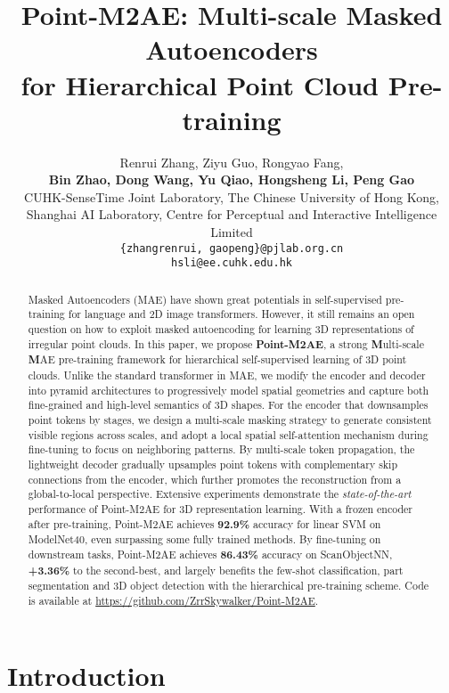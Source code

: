 \documentclass{article}
\title{Point-M2AE: Multi-scale Masked Autoencoders\\ for Hierarchical Point Cloud Pre-training}
\author{Renrui Zhang, Ziyu Guo, Rongyao Fang,\vspace{0.1cm}\\ \textbf{Bin Zhao, Dong Wang, Yu Qiao, Hongsheng Li, Peng Gao\textsuperscript{\Letter}}\vspace{0.3cm}\\
   CUHK-SenseTime Joint Laboratory, The Chinese University of Hong Kong,\\
   Shanghai AI Laboratory,
   Centre for Perceptual and Interactive Intelligence Limited\vspace{0.1cm}\\
  \texttt{\{zhangrenrui, gaopeng\}@pjlab.org.cn} \\
  \texttt{hsli@ee.cuhk.edu.hk} \\
}
\begin{document}
\maketitle


\begin{abstract}
Masked Autoencoders (MAE) have shown great potentials in self-supervised pre-training for language and 2D image transformers. However, it still remains an open question on how to exploit masked autoencoding for learning 3D representations of irregular point clouds. In this paper, we propose \textbf{Point-M2AE}, a strong \textbf{M}ulti-scale \textbf{M}AE pre-training framework for hierarchical self-supervised learning of 3D point clouds. Unlike the standard transformer in MAE, we modify the encoder and decoder into pyramid architectures to progressively model spatial geometries and capture both fine-grained and high-level semantics of 3D shapes. For the encoder that downsamples point tokens by stages, we design a multi-scale masking strategy to generate consistent visible regions across scales, and adopt a local spatial self-attention mechanism during fine-tuning to focus on neighboring patterns. By multi-scale token propagation, the lightweight decoder gradually upsamples point tokens with complementary skip connections from the encoder, which further promotes the reconstruction from a global-to-local perspective. 
Extensive experiments demonstrate the \textit{state-of-the-art} performance of Point-M2AE for 3D representation learning. With a frozen encoder after pre-training, Point-M2AE achieves \textbf{92.9\%} accuracy for linear SVM on ModelNet40, even surpassing some fully trained methods. By fine-tuning on downstream tasks, Point-M2AE achieves \textbf{86.43\%} accuracy on ScanObjectNN, \textbf{+3.36\%} to the second-best, and largely benefits the few-shot classification, part segmentation and 3D object detection with the hierarchical pre-training scheme. Code is available at \url{https://github.com/ZrrSkywalker/Point-M2AE}.


\end{abstract}

\section{Introduction}
\end{document}
